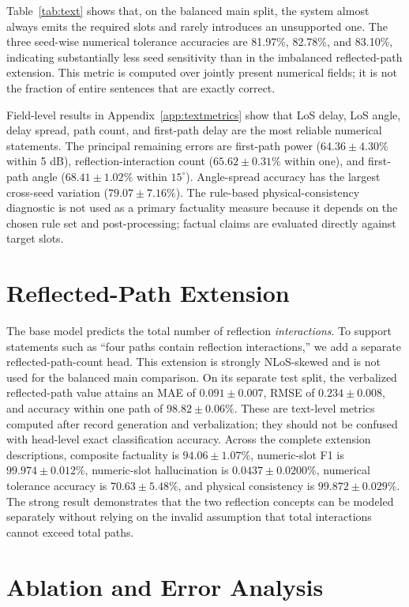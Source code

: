 \documentclass{article}
\begin{document}
Table~\ref{tab:text} shows that, on the balanced main split, the system almost always emits the required slots and rarely introduces an unsupported one.
The three seed-wise numerical tolerance accuracies are 81.97\%, 82.78\%, and 83.10\%, indicating substantially less seed sensitivity than in the imbalanced reflected-path extension.
This metric is computed over jointly present numerical fields; it is not the fraction of entire sentences that are exactly correct.

Field-level results in Appendix~\ref{app:textmetrics} show that LoS delay, LoS angle, delay spread, path count, and first-path delay are the most reliable numerical statements.
The principal remaining errors are first-path power ($64.36\pm4.30\%$ within 5 dB), reflection-interaction count ($65.62\pm0.31\%$ within one), and first-path angle ($68.41\pm1.02\%$ within $15^\circ$).
Angle-spread accuracy has the largest cross-seed variation ($79.07\pm7.16\%$).
The rule-based physical-consistency diagnostic is not used as a primary factuality measure because it depends on the chosen rule set and post-processing; factual claims are evaluated directly against target slots.

\section{Reflected-Path Extension}
\label{sec:pathcount}

The base model predicts the total number of reflection \emph{interactions}.
To support statements such as ``four paths contain reflection interactions,'' we add a separate reflected-path-count head.
This extension is strongly NLoS-skewed and is not used for the balanced main comparison.
On its separate test split, the verbalized reflected-path value attains an MAE of $0.091\pm0.007$, RMSE of $0.234\pm0.008$, and accuracy within one path of $98.82\pm0.06\%$.
These are text-level metrics computed after record generation and verbalization; they should not be confused with head-level exact classification accuracy.
Across the complete extension descriptions, composite factuality is $94.06\pm1.07\%$, numeric-slot F1 is $99.974\pm0.012\%$, numeric-slot hallucination is $0.0437\pm0.0200\%$, numerical tolerance accuracy is $70.63\pm5.48\%$, and physical consistency is $99.872\pm0.029\%$.
The strong result demonstrates that the two reflection concepts can be modeled separately without relying on the invalid assumption that total interactions cannot exceed total paths.

\section{Ablation and Error Analysis}
\label{sec:ablation}
\end{document}
